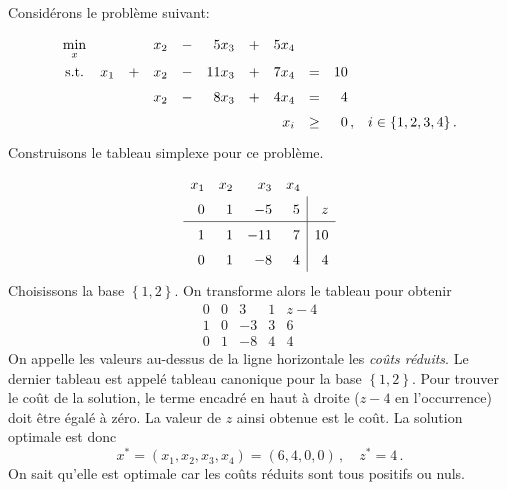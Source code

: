 \begin{myexem}
	Considérons le problème suivant:
	\[
	\renewcommand{\arraystretch}{1.5}
	\begin{array}{c@{\quad}rcrcrcrcr@{\quad}l}
		\min\limits_{x} &&& x_2 & - & 5 x_3 & + & 5 x_4 &&& \\
		\textnormal{s.t.} & x_1 & + & x_2 & - & 11 x_3 & + & 7 x_4 & = & 10\phantom{\,,} & \\
		&&& x_2 & - & 8 x_3 & + & 4 x_4 & = & 4\phantom{\,,} & \\
		&&&&&&& x_i & \ge & 0\,, & i \in \{1,2,3,4\}\,.
	\end{array}
	\]
	Construisons le tableau simplexe pour ce problème.
	\[
	\renewcommand{\arraystretch}{1.5}
	\begin{array}{rrrr|r}
		x_1 & x_2 &  x_3 & \multicolumn{1}{r}{x_4} &    \\
		  0 &   1 &   -5 &                       5 &  z \\
		\hline
		  1 &   1 &  -11 &                       7 & 10 \\
		  0 &   1 &   -8 &                       4 &  4
	\end{array}
	\]
	Choisissons la base $\left\{1, 2\right\}$.
	On transforme alors le tableau pour obtenir
	\[
	\renewcommand{\arraystretch}{1.5}
	\begin{array}{cccc|c}
		0 & 0 &  3 & 1 & z-4 \\
		\hline
		1 & 0 & -3 & 3 &   6 \\
		0 & 1 & -8 & 4 &   4
	\end{array}
	\]
	On appelle les valeurs au-dessus de la ligne horizontale
	les \emph{coûts réduits}.
	Le dernier tableau est appelé
	tableau canonique pour la base $\left\{1, 2\right\}$.
	Pour trouver le coût de la solution,
	le terme encadré en haut à droite
	($z-4$ en l'occurrence) doit être égalé à zéro.
	La valeur de $z$ ainsi obtenue est le coût.
	La solution optimale est donc
	\[
	x^* = (x_1, x_2, x_3, x_4) = (6,4,0,0)\,,\quad z^* = 4\,.
	\]
	On sait qu'elle est optimale
	car les coûts réduits sont tous positifs ou nuls.


\end{myexem}
